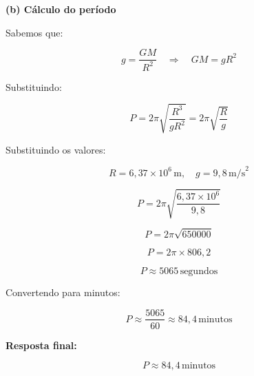 \documentclass[a4paper,12pt]{article}
\begin{document}
\begin{flushleft}
\textbf{(b) Cálculo do período}

Sabemos que:

\begin{equation}
g = \frac{G M}{R^2}
\quad \Rightarrow \quad G M = g R^2
\end{equation}

Substituindo:

\begin{equation}
P = 2\pi \sqrt{ \frac{R^3}{g R^2} } = 2\pi \sqrt{ \frac{R}{g} }
\end{equation}

Substituindo os valores:

\begin{equation}
R = 6{,}37 \times 10^6 \, \text{m}, \quad g = 9{,}8 \, \text{m/s}^2
\end{equation}

\begin{equation}
P = 2\pi \sqrt{ \frac{6{,}37 \times 10^6}{9{,}8} }
\end{equation}

\begin{equation}
P = 2\pi \sqrt{650000}
\end{equation}

\begin{equation}
P = 2\pi \times 806{,}2
\end{equation}

\begin{equation}
P \approx 5065 \, \text{segundos}
\end{equation}

Convertendo para minutos:

\begin{equation}
P \approx \frac{5065}{60} \approx 84{,}4 \, \text{minutos}
\end{equation}

\vspace{0.5cm}

\textbf{Resposta final:}

\begin{equation}
\boxed{P \approx 84{,}4 \, \text{minutos}}
\end{equation}

\end{flushleft}
\end{document}
